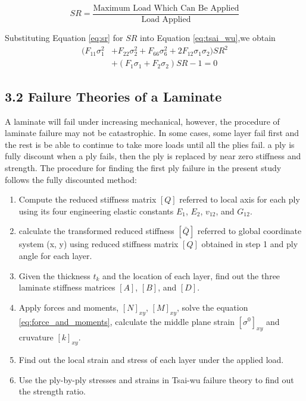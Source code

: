 \documentclass[Afour,sagev,times]{sagej}
\begin{document}
\begin{equation} \label{eq:sr}
	S R=\frac{\text {Maximum Load Which Can Be Applied}}{\text {Load Applied}}
\end{equation}


Substituting Equation \ref{eq:sr} for $SR$ into Equation \ref{eq:tsai_wu},we obtain
\begin{equation}
	\begin{split}
    	(F_{11}\sigma_1^2 & +F_{22}\sigma_2^2+F_{66}\sigma_6^2+2F_{12}\sigma_1\sigma_2)SR^2 \\ 
						  & +(F_1\sigma_1+F_2\sigma_2)SR-1=0
	 \end{split}
\end{equation}


\subsection{3.2 Failure Theories of a Laminate}
A laminate will fail under increasing mechanical, however, the procedure of laminate failure may not
be catastrophic. In some cases, some layer fail first and the rest is be able to continue to take
more loads until all the plies fail. a ply is fully discount when a ply fails, then the ply is
replaced by near zero stiffness and strength. The procedure for finding the first ply failure in the
present study follows the fully discounted method\cite{daniel1994engineering}:
\begin{enumerate}
	\item Compute the reduced stiffness matrix $[Q]$ referred to local axis for each ply using its
		four engineering elastic constants $E_1$, $E_2$, $v_{12}$, and $G_{12}$.
	\item calculate the transformed reduced stiffness $[\bar{Q}]$ referred to global coordinate
		system (x, y) using reduced stiffness matrix $[Q]$ obtained in step 1 and ply angle for each layer.
	\item Given the thickness $t_k$ and the location of each layer, find out the three laminate
		stiffness matrices $[A]$, $[B]$, and $[D]$.
	\item Apply forces and moments, $[N]_{xy}$, $[M]_{xy}$, solve the equation
		\ref{eq:force_and_moments}, calculate the middle plane strain $[\sigma^0]_{xy}$ and
		cruvature $[k]_{xy}$.
	\item Find out the local strain and stress of each layer under the applied load.
	\item Use the ply-by-ply stresses and strains in Tsai-wu failure theory to find out the strength
		ratio.
\end{enumerate}
\end{document}
